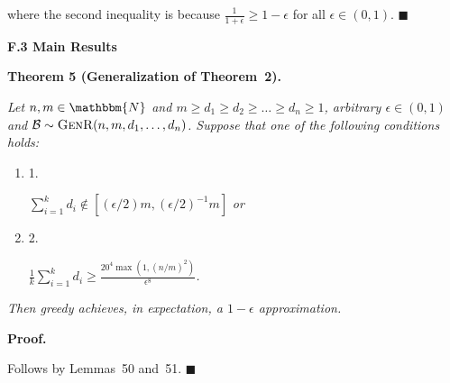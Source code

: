 where the second inequality is because $\frac{1}{1+\epsilon}\geq 1-\epsilon$ for all $\epsilon\in(0,1)$.
\ensuremath{\blacksquare}\par






\par\medskip\noindent\textbf{F.3 Main Results}\par





\par\medskip\noindent\textbf{\textbf{Theorem 5}\textbf{ }(Generalization of Theorem 2)\textbf{.}}\par



\emph{Let $n,m\in\mathbbm{N}$ and $m\geq d_{1}\geq d_{2}\geq\dots\geq d_{n}\geq 1$, arbitrary $\epsilon\in(0,1)$ and $\mathcal{B}\sim\textsc{GenR}(n,m,d_{1},\dots,d_{n})$.
Suppose that one of the following conditions holds:}\par


\begin{enumerate}


\item[] 1. 


$\sum_{i=1}^{k}d_{i}\not\in[(\epsilon/2)m,(\epsilon/2)^{-1}m]$\emph{ or}\par




\item[] 2. 


$\frac{1}{k}\sum_{i=1}^{k}d_{i}\geq\frac{20^{4}\max(1,(n/m)^{2})}{\epsilon^{8}}$\emph{.}\par




\end{enumerate}


\emph{Then greedy achieves, in expectation, a $1-\epsilon$ approximation.}\par






\par\medskip\noindent\textbf{Proof.}\par



Follows by Lemmas 50 and 51.
\ensuremath{\blacksquare}\par




